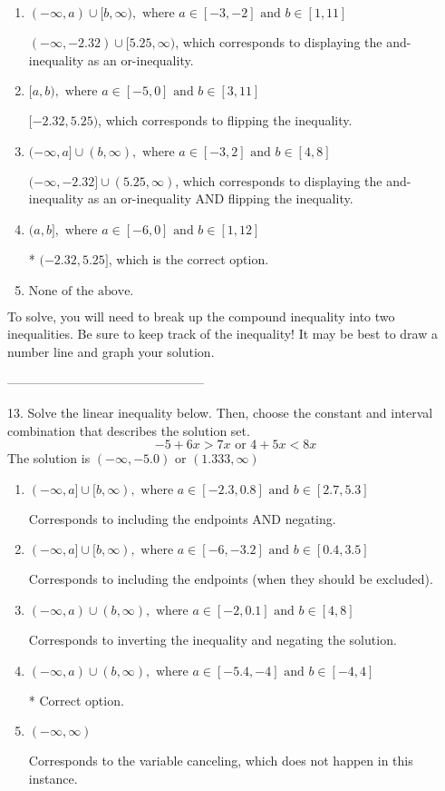 \documentclass{article}[14pt]
\begin{document}
\begin{enumerate}[label=\Alph*.] 
\item $ (-\infty, a) \cup [b, \infty), \text{ where } a \in [-3, -2] \text{ and } b \in [1, 11] $ 

 $(-\infty, -2.32) \cup [5.25, \infty)$, which corresponds to displaying the and-inequality as an or-inequality. 
\item $ [a, b), \text{ where } a \in [-5, 0] \text{ and } b \in [3, 11] $ 

 $[-2.32, 5.25)$, which corresponds to flipping the inequality. 
\item $ (-\infty, a] \cup (b, \infty), \text{ where } a \in [-3, 2] \text{ and } b \in [4, 8] $ 

 $(-\infty, -2.32] \cup (5.25, \infty)$, which corresponds to displaying the and-inequality as an or-inequality AND flipping the inequality. 
\item $ (a, b], \text{ where } a \in [-6, 0] \text{ and } b \in [1, 12] $ 

 * $(-2.32, 5.25]$, which is the correct option. 
\item $ \text{None of the above.} $ 

  
\end{enumerate} 
 
To solve, you will need to break up the compound inequality into two inequalities. Be sure to keep track of the inequality! It may be best to draw a number line and graph your solution.

-----------------------------------------------

13. Solve the linear inequality below. Then, choose the constant and interval combination that describes the solution set.
$$ -5 + 6 x > 7 x \text{ or } 4 + 5 x < 8 x $$ 
The solution is $ (-\infty, -5.0) \text{ or } (1.333, \infty) $ 

\begin{enumerate}[label=\Alph*.] 
\item $ (-\infty, a] \cup [b, \infty), \text{ where } a \in [-2.3, 0.8] \text{ and } b \in [2.7, 5.3] $ 

 Corresponds to including the endpoints AND negating. 
\item $ (-\infty, a] \cup [b, \infty), \text{ where } a \in [-6, -3.2] \text{ and } b \in [0.4, 3.5] $ 

 Corresponds to including the endpoints (when they should be excluded). 
\item $ (-\infty, a) \cup (b, \infty), \text{ where } a \in [-2, 0.1] \text{ and } b \in [4, 8] $ 

 Corresponds to inverting the inequality and negating the solution. 
\item $ (-\infty, a) \cup (b, \infty), \text{ where } a \in [-5.4, -4] \text{ and } b \in [-4, 4] $ 

  * Correct option. 
\item $ (-\infty, \infty) $ 

 Corresponds to the variable canceling, which does not happen in this instance. 
\end{enumerate} 
 
\end{document}

